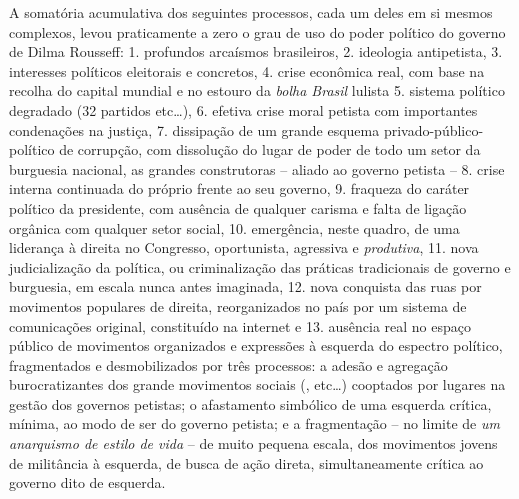 A somatória acumulativa dos seguintes processos, cada um deles em si
mesmos complexos, levou praticamente a zero o grau de uso do poder
político do governo de Dilma Rousseff: 1. profundos arcaísmos
brasileiros, 2. ideologia antipetista, 3. interesses políticos
eleitorais e concretos, 4. crise econômica real, com base na recolha do
capital mundial e no estouro da \emph{bolha Brasil} lulista 5. sistema
político degradado (32 partidos etc…), 6. efetiva crise moral petista
com importantes condenações na justiça, 7. dissipação de um grande
esquema privado-público-político de corrupção, com dissolução do lugar
de poder de todo um setor da burguesia nacional, as grandes construtoras
-- aliado ao governo petista -- 8. crise interna continuada do próprio
 frente ao seu governo, 9. fraqueza do caráter político da presidente,
com ausência de qualquer carisma e falta de ligação orgânica com
qualquer setor social, 10. emergência, neste quadro, de uma liderança à
direita no Congresso, oportunista, agressiva e \emph{produtiva}, 11.
nova judicialização da política, ou criminalização das práticas
tradicionais de governo e burguesia, em escala nunca antes imaginada,
12. nova conquista das ruas por movimentos populares de direita,
reorganizados no país por um sistema de comunicações original,
constituído na internet e 13. ausência real no espaço público de
movimentos organizados e expressões à esquerda do espectro político,
fragmentados e desmobilizados por três processos: a adesão e agregação
burocratizantes dos grande movimentos sociais (,  etc…)
cooptados por lugares na gestão dos governos petistas; o afastamento
simbólico de uma esquerda crítica, mínima, ao modo de ser do governo
petista; e a fragmentação -- no limite de \emph{um anarquismo de estilo
de vida} -- de muito pequena escala, dos movimentos jovens de militância
à esquerda, de busca de ação direta, simultaneamente crítica ao governo
dito de esquerda.

